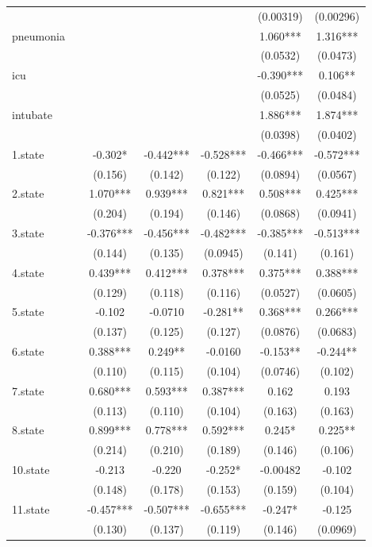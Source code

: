 \documentclass[]{article}
\begin{document}
\begin{tabular}{lcccccc}
 &  &  &  &  & (0.00319) & (0.00296) \\
pneumonia &  &  &  &  & 1.060*** & 1.316*** \\
 &  &  &  &  & (0.0532) & (0.0473) \\
icu &  &  &  &  & -0.390*** & 0.106** \\
 &  &  &  &  & (0.0525) & (0.0484) \\
intubate &  &  &  &  & 1.886*** & 1.874*** \\
 &  &  &  &  & (0.0398) & (0.0402) \\
1.state &  & -0.302* & -0.442*** & -0.528*** & -0.466*** & -0.572*** \\
 &  & (0.156) & (0.142) & (0.122) & (0.0894) & (0.0567) \\
2.state &  & 1.070*** & 0.939*** & 0.821*** & 0.508*** & 0.425*** \\
 &  & (0.204) & (0.194) & (0.146) & (0.0868) & (0.0941) \\
3.state &  & -0.376*** & -0.456*** & -0.482*** & -0.385*** & -0.513*** \\
 &  & (0.144) & (0.135) & (0.0945) & (0.141) & (0.161) \\
4.state &  & 0.439*** & 0.412*** & 0.378*** & 0.375*** & 0.388*** \\
 &  & (0.129) & (0.118) & (0.116) & (0.0527) & (0.0605) \\
5.state &  & -0.102 & -0.0710 & -0.281** & 0.368*** & 0.266*** \\
 &  & (0.137) & (0.125) & (0.127) & (0.0876) & (0.0683) \\
6.state &  & 0.388*** & 0.249** & -0.0160 & -0.153** & -0.244** \\
 &  & (0.110) & (0.115) & (0.104) & (0.0746) & (0.102) \\
7.state &  & 0.680*** & 0.593*** & 0.387*** & 0.162 & 0.193 \\
 &  & (0.113) & (0.110) & (0.104) & (0.163) & (0.163) \\
8.state &  & 0.899*** & 0.778*** & 0.592*** & 0.245* & 0.225** \\
 &  & (0.214) & (0.210) & (0.189) & (0.146) & (0.106) \\
10.state &  & -0.213 & -0.220 & -0.252* & -0.00482 & -0.102 \\
 &  & (0.148) & (0.178) & (0.153) & (0.159) & (0.104) \\
11.state &  & -0.457*** & -0.507*** & -0.655*** & -0.247* & -0.125 \\
 &  & (0.130) & (0.137) & (0.119) & (0.146) & (0.0969) \\

\end{tabular}
\end{document}
